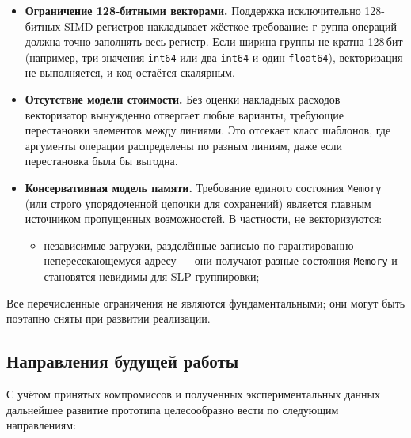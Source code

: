 \begin{itemize}
    \item \textbf{Ограничение 128-битными векторами.}
    Поддержка исключительно 128-битных SIMD-регистров накладывает жёсткое требование: г
    руппа операций должна точно заполнять весь регистр. Если ширина группы не кратна 128\,бит 
    (например, три значения \texttt{int64} или два \texttt{int64} и один \texttt{float64}), 
    векторизация не выполняется, и код остаётся скалярным.

    \item \textbf{Отсутствие модели стоимости.}
    Без оценки накладных расходов векторизатор вынужденно отвергает любые варианты, 
    требующие перестановки элементов между линиями. Это отсекает класс шаблонов, 
    где аргументы операции распределены по разным линиям, даже если перестановка была бы выгодна.

    \item \textbf{Консервативная модель памяти.}
    Требование единого состояния \texttt{Memory} (или строго упорядоченной цепочки для сохранений) 
    является главным источником пропущенных возможностей. В частности, не векторизуются:
    \begin{itemize}
        \item независимые загрузки, разделённые записью по гарантированно непересекающемуся адресу — они получают разные состояния \texttt{Memory} и становятся невидимы для SLP-группировки;
    \end{itemize}
\end{itemize}

Все перечисленные ограничения не являются фундаментальными; они могут быть поэтапно сняты при развитии реализации.

\subsection{Направления будущей работы}
\label{sec:future_work}

С учётом принятых компромиссов и полученных экспериментальных данных дальнейшее развитие 
прототипа целесообразно вести по следующим направлениям:

